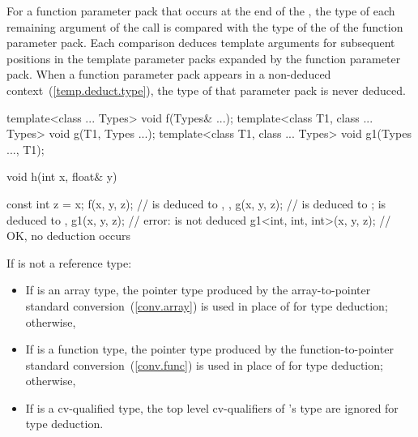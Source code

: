 \exitexample
For a function parameter pack that occurs at the end of the ,
the type  of each
remaining argument of the call is compared with the type 
of the  of the function parameter pack.
Each comparison deduces template arguments for subsequent positions in
the template parameter packs expanded by the function parameter pack.
When a function parameter pack appears in a non-deduced
context~(\ref{temp.deduct.type}), the type of that parameter pack is
never deduced.
\enterexample

\begin{codeblock}
template<class ... Types> void f(Types& ...);
template<class T1, class ... Types> void g(T1, Types ...);
template<class T1, class ... Types> void g1(Types ..., T1);

void h(int x, float& y) {
  const int z = x;
  f(x, y, z);                  //  is deduced to , , 
  g(x, y, z);                  //  is deduced to ;  is deduced to , 
  g1(x, y, z);                 // error:  is not deduced
  g1<int, int, int>(x, y, z);  // OK, no deduction occurs

}
\end{codeblock}

\exitexample

\pnum
If
is not a reference type:

\begin{itemize}
\item
If
is an array type, the pointer type produced by the array-to-pointer
standard conversion~(\ref{conv.array}) is used in place of
for type deduction;
otherwise,
\item
If
is a function type, the pointer type produced by the
function-to-pointer standard conversion~(\ref{conv.func}) is used in place
of
for type
deduction; otherwise,
\item
If
is a cv-qualified type, the top level cv-qualifiers of
's
type are ignored for type deduction.
\end{itemize}

